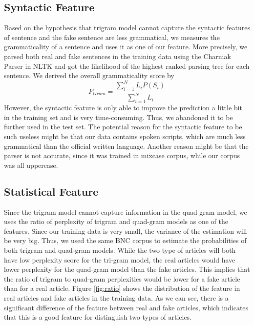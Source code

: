 \begin{itemize}
 
\end{itemize}


\subsection{Syntactic Feature}
Based on the hypothesis that trigram model cannot capture the syntactic features of sentence and the fake sentence are less grammatical, we measures the grammaticality of a sentence and uses it as one of our feature. More precisely, we parsed both real and fake sentences in the training data using the Charniak Parser in NLTK and got the likelihood of the highest ranked parsing tree for each sentence. We derived the overall grammaticality score by 
$$P_{Gram} = \frac{\sum_{i=1}^N L_iP(S_i)}{\sum_{i=1}^N L_i}$$
However, the syntactic feature is only able to improve the prediction a little bit in the training set and is very time-consuming. Thus, we abandoned it to be further used in the test set.
The potential reason for the syntactic feature to be such useless might be that our data contains spoken scripts, which are much less grammatical than the official written language. Another reason might be that the parser is not accurate, since it was trained in mixcase corpus, while our corpus was all uppercase.

\subsection{Statistical Feature}
Since the trigram model cannot capture information in the quad-gram model, we uses the ratio of perplexity of trigram and quad-gram models as one of the features. Since our training data is very small, the variance of the estimation will be very big. Thus, we used the same BNC corpus to estimate the probabilities of both trigram and quad-gram models. While the two type of articles will both have low perplexity score for the tri-gram model, the real articles would have lower perplexity for the quad-gram model than the fake articles. This implies that the ratio of trigram to quad-gram perplexities would be lower for a fake article than for a real article. Figure \ref{fig:ratio} shows the distribution of the feature in real articles and fake articles in the training data. As we can see, there is a significant difference of the feature between real and fake articles, which indicates that this is a good feature for distinguish two types of articles. 

